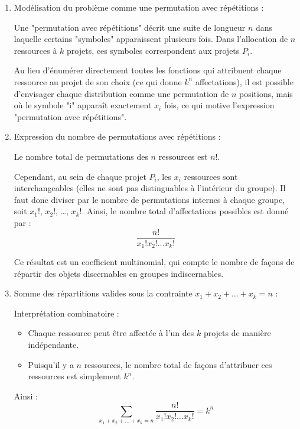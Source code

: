 \documentclass[10pt,a4paper]{article}
\begin{document}
   \begin{enumerate}

      \item Modélisation du problème comme une permutation avec répétitions :

      Une "permutation avec répétitions" décrit une suite de longueur $n$ dans laquelle certains
      "symboles" apparaissent plusieurs fois. Dans l'allocation de $n$ ressources à
      $k$ projets, ces symboles correspondent aux projets $P_i$.

      Au lieu d'énumérer directement toutes les fonctions qui attribuent chaque ressource au projet
      de son choix (ce qui donne $k^n$ affectations), il est possible d'envisager chaque
      distribution comme une permutation de $n$ positions, mais où le symbole "i" apparaît
      exactement $x_i$ fois, ce qui motive l'expression "permutation avec répétitions".

      \item Expression du nombre de permutations avec répétitions :

      Le nombre total de permutations des \( n \) ressources est $ n! $.

      Cependant, au sein de chaque projet \( P_i \), les \( x_i \) ressources sont interchangeables
      (elles ne sont pas distinguables à l'intérieur du groupe). Il faut donc diviser par le nombre
      de permutations internes à chaque groupe, soit \( x_1! \), \( x_2! \), …, \( x_k! \). Ainsi,
      le nombre total d'affectations possibles est donné par :
      \[
      \frac{n!}{x_1! x_2! \dots x_k!}
      \]

      Ce résultat est un coefficient multinomial, qui compte le nombre de façons de répartir des
      objets discernables en groupes indiscernables.


      \item Somme des répartitions valides sous la contrainte \( x_1 + x_2 + \dots + x_k = n \) :

      Interprétation combinatoire :
      \begin{itemize}
         \item Chaque ressource peut être affectée à l'un des \( k \) projets de manière indépendante.
         \item Puisqu'il y a \( n \) ressources, le nombre total de façons d'attribuer ces ressources est simplement \( k^n \).
      \end{itemize}
      Ainsi :
      \[
      \sum_{x_1 + x_2 + \dots + x_k = n} \frac{n!}{x_1! x_2! \dots x_k!} = k^n
      \]

   \end{enumerate}
\end{document}
